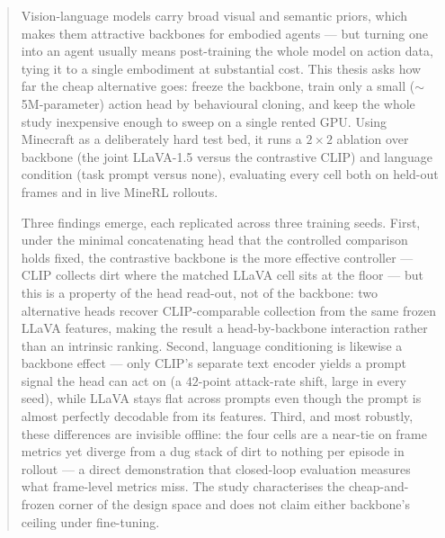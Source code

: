 \documentclass[pdftex,12pt,a4paper]{report}
\begin{document}
\deckblatt

\erklaerung

\begin{abstract}
Vision-language models carry broad visual and semantic priors, which makes them
attractive backbones for embodied agents --- but turning one into an agent
usually means post-training the whole model on action data, tying it to a single
embodiment at substantial cost. This thesis asks how far the cheap alternative
goes: freeze the backbone, train only a small ($\sim$5M-parameter) action head by
behavioural cloning, and keep the whole study inexpensive enough to sweep on a
single rented GPU. Using Minecraft as a deliberately hard test bed, it runs a
$2\times2$ ablation over backbone (the joint LLaVA-1.5 versus the contrastive
CLIP) and language condition (task prompt versus none), evaluating every cell
both on held-out frames and in live MineRL rollouts.

Three findings emerge, each replicated across three training seeds. First, under
the minimal concatenating head that the controlled comparison holds fixed, the
contrastive backbone is the more effective controller --- CLIP collects dirt where
the matched LLaVA cell sits at the floor --- but this is a property of the head
read-out, not of the backbone: two alternative heads recover CLIP-comparable
collection from the same frozen LLaVA features, making the result a head-by-backbone
interaction rather than an intrinsic ranking. Second, language conditioning is
likewise a backbone effect --- only CLIP's separate text encoder yields a prompt
signal the head can act on (a $42$-point attack-rate shift, large in every seed),
while LLaVA stays flat across prompts even though the prompt is almost perfectly
decodable from its features. Third, and most robustly, these differences are
invisible offline: the four cells are a near-tie on frame metrics yet diverge from
a dug stack of dirt to nothing per episode in rollout --- a direct demonstration
that closed-loop evaluation measures what frame-level metrics miss. The study
characterises the cheap-and-frozen corner of the design space and does not claim
either backbone's ceiling under fine-tuning.
\end{abstract}

\tableofcontents

\end{document}
